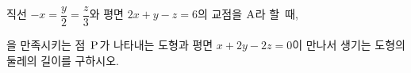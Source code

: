 직선 $-x=\dfrac{y}{2}=\dfrac{z}{3}$와 평면 $2x+y-z=6$의 교점을 $\mathrm{A}$라 할~때, \par\smallskip{}\par\smallskip\noindent 을 만족시키는 점~$\mathrm{P}$가 나타내는 도형과 평면 $x+2y-2z=0$이 만나서 생기는 도형의 둘레의 길이를 구하시오. 

